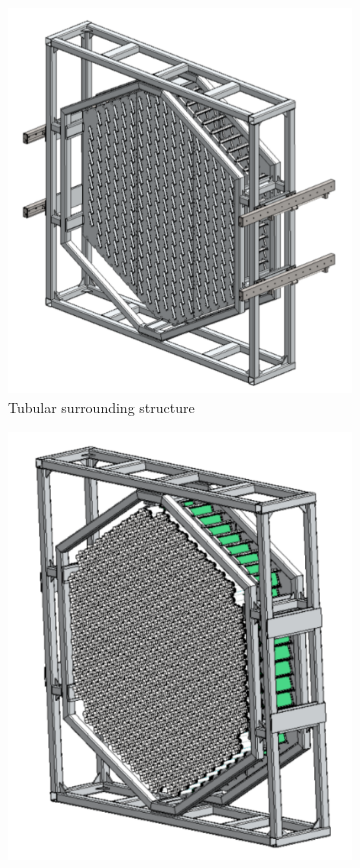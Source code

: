 \documentclass[main.tex]{subfiles}
\begin{document}
\begin{figure}[h]
\begin{subfigure}{0.31\textwidth}
    \includegraphics[width=\linewidth]{Pictures/tubularsurroundingstructure.pdf}
    \caption{Tubular surrounding structure} \label{fig:1b}
  \end{subfigure}%
  \hspace*{\fill}   %
  \begin{subfigure}{0.31\textwidth}
    \includegraphics[width=\linewidth]{Pictures/camerawithmodules.pdf}

\end{subfigure}
\end{figure}
\end{document}
